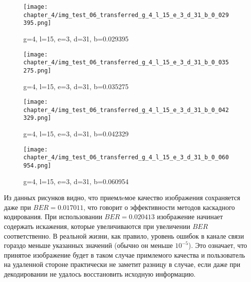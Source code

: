 \begin{figure}[h]
\begin{center}
\begin{minipage}[h]{0.4\linewidth}
\texttt{[image: chapter\_4/img\_test\_06\_transferred\_g\_4\_l\_15\_e\_3\_d\_31\_b\_0\_029395.png]}
\caption{g=4, l=15, e=3, d=31, b=0.029395}
\label{img:experimcoded9}
\end{minipage}
\hfill 
\begin{minipage}[h]{0.4\linewidth}
\texttt{[image: chapter\_4/img\_test\_06\_transferred\_g\_4\_l\_15\_e\_3\_d\_31\_b\_0\_035275.png]}
\caption{g=4, l=15, e=3, d=31, b=0.035275}
\label{img:experimcoded10}
\end{minipage}
\end{center}

\begin{center}
\begin{minipage}[h]{0.4\linewidth}
\texttt{[image: chapter\_4/img\_test\_06\_transferred\_g\_4\_l\_15\_e\_3\_d\_31\_b\_0\_042329.png]}
\caption{g=4, l=15, e=3, d=31, b=0.042329}
\label{img:experimcoded11}
\end{minipage}
\hfill 
\begin{minipage}[h]{0.4\linewidth}
\texttt{[image: chapter\_4/img\_test\_06\_transferred\_g\_4\_l\_15\_e\_3\_d\_31\_b\_0\_060954.png]}
\caption{g=4, l=15, e=3, d=31, b=0.060954}
\label{img:experimcoded12}
\end{minipage}
\end{center}
\end{figure}

Из данных рисунков видно, что приемлeмое качество изображения сохраняется даже при $BER=0.017011$, что говорит
о эффективности методов каскадного кодирования. При использовании $BER=0.020413$ изображение начинает содержать
искажения, которые увеличиваются при увеличении $BER$ соответственно. В реальной жизни, как правило, уровень ошибок в канале связи
гораздо меньше указанных значений (обычно он меньше $10^{-5}$). Это означает, что принятое изображение будет в таком случае примлемого
качества и пользователь на удаленной стороне практически не заметит разницу в случае, если даже при декодировании не удалось
восстановить исходную информацию.


